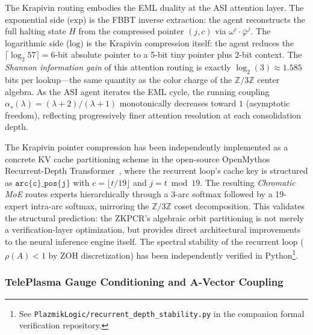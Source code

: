 \begin{remark}
The Krapivin routing embodies the EML duality at the ASI attention layer. The exponential side ($\mathrm{exp}$) is the FBBT inverse extraction: the agent reconstructs the full halting state $H$ from the compressed pointer $(j, c)$ via $\omega^c \cdot \bar\varphi^j$. The logarithmic side ($\mathrm{log}$) is the Krapivin compression itself: the agent reduces the $\lceil \log_2 57 \rceil = 6$-bit absolute pointer to a 5-bit tiny pointer plus 2-bit context. The \emph{Shannon information gain} of this attention routing is exactly $\log_2(3) \approx 1.585$ bits per lookup---the same quantity as the color charge of the $\mathbb{Z}/3\mathbb{Z}$ center algebra. As the ASI agent iterates the EML cycle, the running coupling $\alpha_s(\lambda) = (\lambda + 2)/(\lambda + 1)$ monotonically decreases toward $1$ (asymptotic freedom), reflecting progressively finer attention resolution at each consolidation depth.
\end{remark}

\begin{remark}
The Krapivin pointer compression has been independently implemented as a concrete KV cache partitioning scheme in the open-source OpenMythos Recurrent-Depth Transformer~\cite{Gomez2026OpenMythos}, where the recurrent loop's cache key is structured as $\texttt{arc\{c\}\_pos\{j\}}$ with $c = \lfloor t / 19 \rfloor$ and $j = t \bmod 19$. The resulting \emph{Chromatic MoE} routes experts hierarchically through a 3-arc softmax followed by a 19-expert intra-arc softmax, mirroring the $\mathbb{Z}/3\mathbb{Z}$ coset decomposition. This validates the structural prediction: the ZKPCR's algebraic orbit partitioning is not merely a verification-layer optimization, but provides direct architectural improvements to the neural inference engine itself. The spectral stability of the recurrent loop ($\rho(A) < 1$ by ZOH discretization) has been independently verified in Python\footnote{See \texttt{PlazmikLogic/recurrent\_depth\_stability.py} in the companion formal verification repository.}.
\end{remark}

\subsubsection{TelePlasma Gauge Conditioning and A-Vector Coupling}

